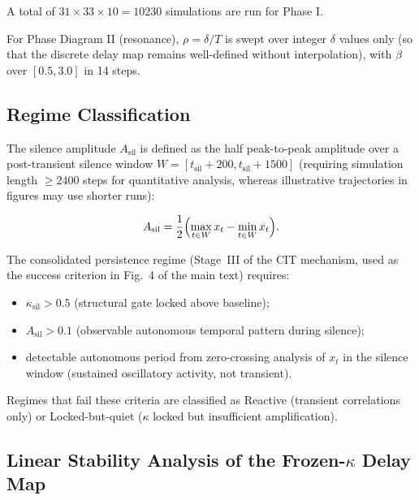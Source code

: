 \documentclass[12pt,a4paper]{article}
\begin{document}
A total of $31 \times 33 \times 10 = 10230$ simulations are run for Phase I.



For Phase Diagram II (resonance), $\rho = \delta/T$ is swept over integer $\delta$ values only (so that the discrete delay map remains well-defined without interpolation), with $\beta$ over $[0.5, 3.0]$ in 14 steps.



\subsection{Regime Classification}
\label{sec:regime_classification}



The silence amplitude \(A_{\mathrm{sil}}\) is defined as the half peak-to-peak amplitude over a post-transient silence window \(W = [t_{\mathrm{sil}}+200, t_{\mathrm{sil}}+1500]\) (requiring simulation length \(\ge 2400\) steps for quantitative analysis, whereas illustrative trajectories in figures may use shorter runs):

\[

A_{\mathrm{sil}} = \frac12\Bigl(\max_{t\in W} x_t - \min_{t\in W} x_t\Bigr).

\]

The consolidated persistence regime (Stage~III of the CIT mechanism, used as the success criterion in Fig.~4 of the main text) requires:

\begin{itemize}

  \item $\kappa_{\mathrm{sil}} > 0.5$ (structural gate locked above baseline);

  \item $A_{\mathrm{sil}} > 0.1$ (observable autonomous temporal pattern during silence);

  \item detectable autonomous period from zero-crossing analysis of $x_t$ in the silence window (sustained oscillatory activity, not transient).

\end{itemize}

Regimes that fail these criteria are classified as Reactive (transient correlations only) or Locked-but-quiet ($\kappa$ locked but insufficient amplification).



\subsection{Linear Stability Analysis of the Frozen-$\kappa$ Delay Map}
\end{document}
